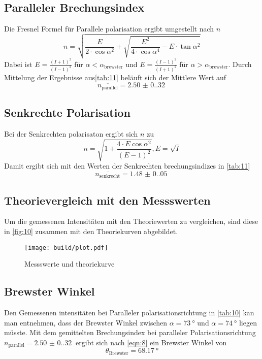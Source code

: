 \subsection{Paralleler Brechungsindex}
\label{sec:10}
Die Fresnel Formel für Parallele polarisation ergibt umgestellt nach $n$
\begin{equation}
n = \sqrt{\frac{E}{2\cdot\cos{\alpha}^2} + \sqrt{\frac{E^2}{4\cdot\cos{\alpha}^4} - E \cdot \tan{\alpha}^2}}
\end{equation}
Dabei ist $E = \frac{(I+1)^2}{(I - 1)^2}$ für $\alpha < \alpha_\text{brewster}$ und  
$E = \frac{(I-1)^2}{(I + 1)^2}$ für $\alpha > \alpha_\text{brewster}$. 
Durch Mittelung der Ergebnisse aus\autoref{tab:11} beläuft sich der Mittlere Wert auf 
\begin{equation}
  \overline{n_\text{parallel}} = \qty{2.50(0.32)}{}
\end{equation}

\subsection{Senkrechte Polarisation}
\label{sec:11}
Bei der Senkrechten polarisaton ergibt sich $n$ zu
\begin{equation}
n = \sqrt{1+\frac{4\cdot E \cos{\alpha}^2}{(E-1)^2}}  , E = \sqrt{I}
\end{equation}
Damit ergibt sich mit den Werten der Senkrechten brechungsindizes in \autoref{tab:11} 
\begin{equation}
 \overline{n_\text{senkrecht}} = \qty{1.48(0.05)}{}
\end{equation}
\subsection{Theorievergleich mit den Messswerten}
Um die gemessenen Intensitäten mit den Theoriewerten zu vergleichen, sind 
diese in \autoref{fig:10} zusammen mit den Theoriekurven abgebildet. 
\begin{figure}[H]
  \centering 
  \caption{Messswerte und theoriekurve}
  \label{fig:10}
  \texttt{[image: build/plot.pdf]}
\end{figure}
\subsection{Brewster Winkel}
Den Gemessenen intensitäten bei Paralleler polarisationsrichtung in \autoref{tab:10} kan man entnehmen, dass 
der Brewster Winkel zwischen $\alpha = \qty{73}{\degree}$ und $\alpha = \qty{74}{\degree}$ liegen müsste. Mit dem 
gemittelten Brechungsindex bei paralleler Polarisationsrichtung $n_\text{parallel} = \qty{2.50(0.32)}{}$ ergibt sich nach \autoref{eqn:8}
ein Brewster Winkel von
\begin{equation}
 \theta_\text{Brewster} = \qty{68.17}{\degree}
\end{equation}


